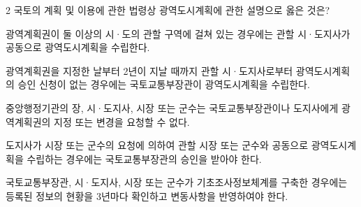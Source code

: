 \begin{question}{2}
국토의 계획 및 이용에 관한 법령상 광역도시계획에 관한 설명으로 옳은 것은?
\begin{choices}
  \item 광역계획권이 둘 이상의 시·도의 관할 구역에 걸쳐 있는 경우에는 관할 시·도지사가 공동으로 광역도시계획을 수립한다.
  \item 광역계획권을 지정한 날부터 2년이 지날 때까지 관할 시·도지사로부터 광역도시계획의 승인 신청이 없는 경우에는 국토교통부장관이 광역도시계획을 수립한다.
  \item 중앙행정기관의 장, 시·도지사, 시장 또는 군수는 국토교통부장관이나 도지사에게 광역계획권의 지정 또는 변경을 요청할 수 없다.
  \item 도지사가 시장 또는 군수의 요청에 의하여 관할 시장 또는 군수와 공동으로 광역도시계획을 수립하는 경우에는 국토교통부장관의 승인을 받아야 한다.
  \item 국토교통부장관, 시·도지사, 시장 또는 군수가 기초조사정보체계를 구축한 경우에는 등록된 정보의 현황을 3년마다 확인하고 변동사항을 반영하여야 한다.
\end{choices}
\end{question}

